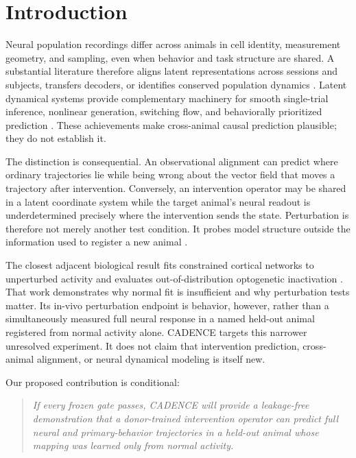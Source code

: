 \documentclass[11pt]{article}
\begin{document}
\section{Introduction}

Neural population recordings differ across animals in cell identity,
measurement geometry, and sampling, even when behavior and task structure are
shared. A substantial literature therefore aligns latent representations
across sessions and subjects, transfers decoders, or identifies conserved
population dynamics
\citep{chen2015srm,dyer2017cryptography,gallego2020stability,
safaie2023preserved,schneider2023cebra,gosztolai2025marble,jiang2025candy}.
Latent dynamical systems provide complementary machinery for smooth
single-trial inference, nonlinear generation, switching flow, and
behaviorally prioritized prediction
\citep{yu2009gpfa,pandarinath2018lfads,linderman2017rslds,
glaser2020multipop,sani2024dpad}. These achievements make cross-animal causal
prediction plausible; they do not establish it.

The distinction is consequential. An observational alignment can predict
where ordinary trajectories lie while being wrong about the vector field that
moves a trajectory after intervention. Conversely, an intervention operator
may be shared in a latent coordinate system while the target animal's neural
readout is underdetermined precisely where the intervention sends the state.
Perturbation is therefore not merely another test condition. It probes model
structure outside the information used to register a new animal
\citep{shenoy2021measurement,galgali2023residual}.

The closest adjacent biological result fits constrained cortical networks to
unperturbed activity and evaluates out-of-distribution optogenetic
inactivation \citep{sourmpis2026perturbations}. That work demonstrates why
normal fit is insufficient and why perturbation tests matter. Its in-vivo
perturbation endpoint is behavior, however, rather than a simultaneously
measured full neural response in a named held-out animal registered from
normal activity alone. CADENCE targets this narrower unresolved experiment.
It does not claim that intervention prediction, cross-animal alignment, or
neural dynamical modeling is itself new.

Our proposed contribution is conditional:

\begin{quote}
\emph{If every frozen gate passes, CADENCE will provide a leakage-free
demonstration that a donor-trained intervention operator can predict full
neural and primary-behavior trajectories in a held-out animal whose mapping
was learned only from normal activity.}
\end{quote}
\end{document}
